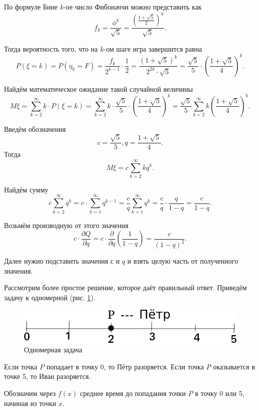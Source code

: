 По формуле Бине $k$-ое число Фибоначчи можно представить как
$$f_k =
\frac{ \phi^k}{ \sqrt{5}} =
\frac{ \left( \frac{1 + \sqrt{5}}{2} \right)^k}{ \sqrt{5}}.$$

Тогда вероятность того, что на $k$-ом шаге игра завершится равна
$$P \left( \xi = k \right) =
P \left( \eta_k = F \right) =
\frac{f_k}{2^{k-1}} \cdot \frac{1}{2} =
\frac{ \left( 1 + \sqrt{5} \right)^k}{2^{2k} \cdot \sqrt{5}} =
\frac{ \sqrt{5}}{5} \cdot \left( \frac{1 + \sqrt{5}}{4} \right)^k.$$

Найдём математическое ожидание такой случайной величины
$$M \xi =
\sum \limits_{k=2}^{ \infty } k \cdot P \left( \xi = k \right) =
\sum \limits_{k=2}^{ \infty } k \cdot \frac{ \sqrt{5}}{5} \cdot \left( \frac{1 + \sqrt{5}}{4} \right)^k =
\frac{ \sqrt{5}}{5} \sum \limits_{k=2}^{ \infty } k \left( \frac{1 + \sqrt{5}}{4} \right)^k.$$

Введём обозначения
$$ c = \frac{ \sqrt{5}}{5}, q = \frac{1 + \sqrt{5}}{4}.$$
Тогда
$$M \xi =
c \sum \limits_{k=2}^{ \infty } kq^{k}.$$

Найдём сумму
$$c \sum \limits_{k=2}^{ \infty } q^k =
c \cdot \sum \limits_{k=1}^{ \infty } q^{k-1} =
\frac{c}{q} \sum \limits_{k=1}^{ \infty } q^{k} =
\frac{c}{q} \cdot \frac{q}{1-q} =
\frac{c}{1-q}.$$

Возьмём производную от этого значения
$$c \cdot \frac{ \partial Q}{ \partial q} =
c \cdot \frac{ \partial }{ \partial q} \left( \frac{1}{1-q} \right) =
\frac{c}{ \left( 1-q \right)^2}.$$

Далее нужно подставить значения $с$ и $q$ и взять целую часть от полученного значения.

Рассмотрим более простое решение, которое даёт правильный ответ.
Приведём задачу к одномерной (рис. \ref{fig:12152}).

\begin{figure}[h!]
  \centering
  \includegraphics[width=1\textwidth]{./pictures/12_15_2.png}
  \caption{Одномерная задача}
  \label{fig:12152}
\end{figure}

Если точка $P$ попадает в точку 0, то Пётр разоряется.
Если точка $P$ оказывается в точке 5, то Иван разоряется.

Обозначим через $f \left( x \right) $ среднее время до попадания точки $P$ в точку 0 или 5, начиная из точки $x$.

